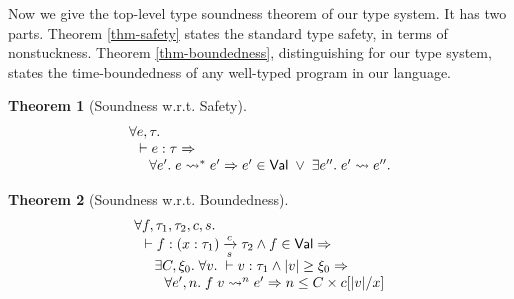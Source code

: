 \documentclass[preprint]{sigplanconf}
\newcommand{\arrow}[4]{#1\xrightarrow[#3]{#2}#4}
\newtheorem{thm}{Theorem}
\begin{document}
Now we give the top-level type soundness theorem of our type system. It has two parts. Theorem \ref{thm-safety} states the standard type safety, in terms of nonstuckness. Theorem \ref{thm-boundedness}, distinguishing for our type system, states the time-boundedness of any well-typed program in our language.

\begin{thm}[\label{thm-safety}Soundness w.r.t. Safety]
$$
\begin{array}{l}
\forall e,\tau. \\
\hspace{.1in} \vdash e:\tau \Rightarrow \\
\hspace{.2in} \forall e'.\; e \leadsto^* e' \Rightarrow e'\in\mathsf{Val} \;\vee\; \exists e''.\;e' \leadsto e''.
\end{array}
$$
\end{thm}

\begin{thm}[\label{thm-boundedness}Soundness w.r.t. Boundedness]
$$
\begin{array}{l}
\forall f,\tau_1,\tau_2,c,s. \\
\hspace{0.1in} \vdash f:\arrow{(x:\tau_1)}{c}{s}{\tau_2} \wedge f\in\mathsf{Val}\Rightarrow \\
\hspace{0.2in} \exists C,\xi_0. \;\forall v.\; \vdash v:\tau_1 \wedge |v| \geq \xi_0 \Rightarrow \\
\hspace{0.3in} \forall e',n.\; f\;v\leadsto^n e' \Rightarrow n\leq C\times c[|v|/x]
\end{array}
$$
\end{thm}
\end{document}
